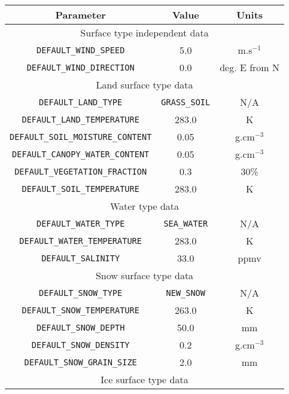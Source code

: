 \begin{table}[htp]
  \centering
  \begin{tabular}{|c|c|c|}
    \hline
    \sffamily\textbf{Parameter} & \sffamily\textbf{Value}  & \sffamily\textbf{Units} \\
    \hline\hline
    \multicolumn{3}{|c|}{Surface type independent data}\\
    \hline
    \texttt{DEFAULT\_WIND\_SPEED}             & 5.0        & m.s$^{-1}$\\
    \texttt{DEFAULT\_WIND\_DIRECTION}         & 0.0        & deg. E from N\\
    \hline
    \multicolumn{3}{|c|}{Land surface type data}\\
    \hline
    \texttt{DEFAULT\_LAND\_TYPE}              & \texttt{GRASS\_SOIL}& N/A \\
    \texttt{DEFAULT\_LAND\_TEMPERATURE}       & 283.0      & K\\
    \texttt{DEFAULT\_SOIL\_MOISTURE\_CONTENT} & 0.05       & g.cm$^{-3}$\\
    \texttt{DEFAULT\_CANOPY\_WATER\_CONTENT}  & 0.05       & g.cm$^{-3}$\\
    \texttt{DEFAULT\_VEGETATION\_FRACTION}    & 0.3        & 30\%\\
    \texttt{DEFAULT\_SOIL\_TEMPERATURE}       & 283.0      & K\\
    \hline
    \multicolumn{3}{|c|}{Water type data}\\
    \hline
    \texttt{DEFAULT\_WATER\_TYPE}             & \texttt{SEA\_WATER} & N/A\\
    \texttt{DEFAULT\_WATER\_TEMPERATURE}      & 283.0      & K\\
    \texttt{DEFAULT\_SALINITY}                & 33.0       & ppmv\\
    \hline
    \multicolumn{3}{|c|}{Snow surface type data}\\
    \hline
    \texttt{DEFAULT\_SNOW\_TYPE}              & \texttt{NEW\_SNOW}  & N/A\\
    \texttt{DEFAULT\_SNOW\_TEMPERATURE}       & 263.0      & K\\
    \texttt{DEFAULT\_SNOW\_DEPTH}             & 50.0       & mm\\
    \texttt{DEFAULT\_SNOW\_DENSITY}           & 0.2        & g.cm$^{-3}$\\
    \texttt{DEFAULT\_SNOW\_GRAIN\_SIZE}       & 2.0        & mm\\
    \hline
    \multicolumn{3}{|c|}{Ice surface type data}\\

\end{tabular}
\end{table}
